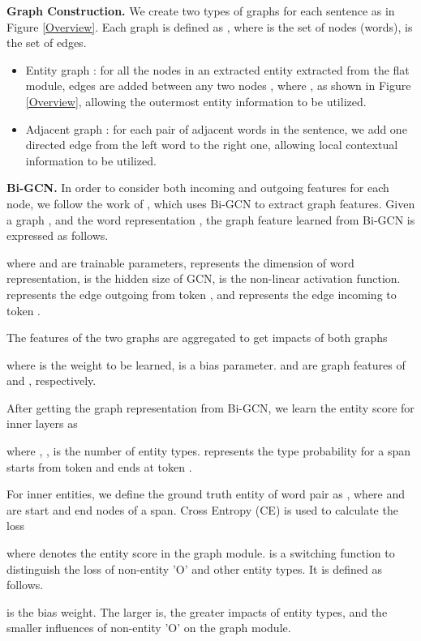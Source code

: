 \documentclass[11pt,a4paper]{article}
\begin{document}
\textbf{Graph Construction.}
We create two types of graphs for each sentence as in Figure \ref{Overview}. Each graph is defined as , where  is the set of nodes (words),  is the set of edges.
\begin{itemize}
    \item Entity graph : for all the nodes in an extracted entity extracted from the flat module, edges are added between any two nodes , where , as shown in Figure \ref{Overview}, allowing the outermost entity information to be utilized.
    \item Adjacent graph : for each pair of adjacent words in the sentence, we add one directed edge from the left word to the right one, allowing local contextual information to be utilized.
\end{itemize}

\textbf{Bi-GCN.}
In order to consider both incoming and outgoing features for each node, we follow the work of \cite{marcheggiani2017encoding, fu2019graphrel}, which uses Bi-GCN to extract graph features. 
Given a graph , and the word representation , the graph feature  learned from Bi-GCN is expressed as follows.


where  and  are trainable parameters,  represents the dimension of word representation,  is the hidden size of GCN,  is the non-linear activation function.  represents the edge outgoing from token , and  represents the edge incoming to token . 

The features of the two graphs are aggregated to get impacts of both graphs

where  is the weight to be learned,  is a bias parameter.  and  are graph features of  and , respectively.

After getting the graph representation  from Bi-GCN, we learn the entity score  for inner layers as

where , ,  is the number of entity types.  represents the type probability for a span starts from token  and ends at token .

For inner entities, we define the ground truth entity of word pair  as , where  and  are start and end nodes of a span.
Cross Entropy (CE) is used to calculate the loss

where  denotes the entity score in the graph module.  is a switching function to distinguish the loss of non-entity 'O' and other entity types. It is defined as follows.
 
 is the bias weight. The larger  is, the greater impacts of entity types, and the smaller influences of non-entity 'O' on the graph module.
\end{document}
